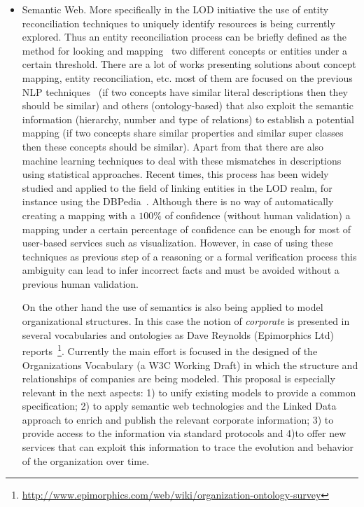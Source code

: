 \documentclass{llncs}
\begin{document}
\begin{itemize}
 \item Semantic Web. More specifically in the LOD initiative the use of entity reconciliation techniques to uniquely identify resources 
 is being currently explored. Thus an entity reconciliation process can be briefly defined as the method for looking and mapping~\cite{DBLP:conf/semweb/IseleJB10} two different 
 concepts or entities under a certain threshold. There are a lot of  works presenting solutions about concept mapping, entity reconciliation, etc. 
 most of them are focused on the previous NLP techniques~\cite{conf/www/MaaliCP11,Serimi} (if two concepts have similar literal descriptions then they should be similar) 
 and others (ontology-based) that also exploit the semantic information (hierarchy, number and type of relations) to establish a potential mapping 
 (if two concepts share similar properties and similar super classes then these concepts should be similar). Apart from that 
 there are also machine learning techniques to deal with these mismatches in descriptions using statistical approaches. Recent times, 
 this process has been widely studied and applied to the field of linking entities in the LOD realm, for instance using the DBPedia~\cite{Mendes:2011:DSS:2063518.2063519}. 
 Although there is no way of automatically creating a mapping with a $100\%$ of confidence (without human validation) a mapping under a certain percentage of confidence can be 
 enough for most of user-based services such as visualization. However, in case of using these techniques as previous step of a reasoning or 
 a formal verification process this ambiguity can lead to infer incorrect facts and must be avoided without a previous human validation. 

 On the other hand the use of semantics is also being applied to model organizational structures. In this case the notion 
 of \textit{corporate} is presented in several vocabularies and ontologies as Dave Reynolds (Epimorphics Ltd) 
 reports~\footnote{\url{http://www.epimorphics.com/web/wiki/organization-ontology-survey}}. 
 Currently the main effort is focused in the designed of the Organizations Vocabulary (a W3C Working Draft) in which the structure and 
 relationships of companies are being modeled. This proposal is especially relevant in the next aspects:  
 1) to unify existing models to provide a common specification; 2) to apply semantic web technologies and the Linked Data approach to enrich 
 and publish the relevant corporate information; 3) to provide access to the information via standard protocols 
 and 4)to  offer new services that can exploit this information to trace the evolution and behavior of the organization over time.


\end{itemize}
\end{document}
